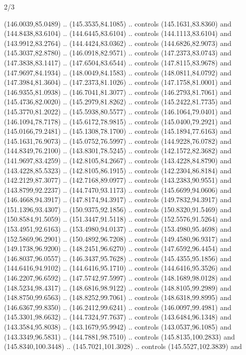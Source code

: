 \begin{flagdescription}{2/3}
\begin{scope}[xshift=0.5\flaglength,yshift=0.5\flagwidth,scale=\flagwidth/180]
\begin{scope}[y=0.8pt, x=0.8pt, yscale=-1,shift={(-168.75,-108.75)}]
  (146.0039,85.0489) .. (145.3535,84.1085) .. controls (145.1631,83.8360) and
  (144.8438,83.6104) .. (144.6445,83.6104) .. controls (144.1113,83.6104) and
  (143.9912,83.2764) .. (144.4424,83.0362) .. controls (144.6826,82.9073) and
  (145.3037,82.8780) .. (146.0918,82.9571) .. controls (147.2373,83.0743) and
  (147.3838,83.1417) .. (147.6504,83.6544) .. controls (147.8115,83.9678) and
  (147.9697,84.1934) .. (148.0049,84.1583) .. controls (148.0811,84.0792) and
  (147.3984,81.3604) .. (147.2373,81.1026) .. controls (147.1758,81.0001) and
  (146.9355,81.0938) .. (146.7041,81.3077) .. controls (146.2793,81.7061) and
  (145.4736,82.0020) .. (145.2979,81.8262) .. controls (145.2422,81.7735) and
  (145.3770,81.2022) .. (145.5938,80.5577) .. controls (146.1064,79.0401) and
  (146.1094,78.7178) .. (145.6172,78.9815) .. controls (145.0400,79.2921) and
  (145.0166,79.2481) .. (145.1308,78.1700) .. controls (145.1894,77.6163) and
  (145.1631,76.9073) .. (145.0752,76.5997) .. controls (144.9228,76.0782) and
  (144.8349,76.2100) .. (143.8301,78.5245) .. controls (142.1572,82.3682) and
  (141.9697,83.4259) .. (142.8105,84.2667) .. controls (143.4228,84.8790) and
  (143.4228,85.5323) .. (142.8105,86.1915) .. controls (142.2304,86.8184) and
  (142.2129,87.3077) .. (142.7168,89.0977) .. controls (143.2383,90.9551) and
  (143.8799,92.2237) .. (144.7470,93.1173) .. controls (145.6699,94.0606) and
  (146.4668,94.3917) .. (147.8174,94.3917) .. controls (149.7832,94.3917) and
  (151.1396,93.4307) .. (150.9375,92.1856) .. controls (150.8320,91.5469) and
  (150.8584,91.5059) .. (151.3447,91.5118) .. controls (152.5576,91.5264) and
  (153.4951,92.6163) .. (153.4980,94.0137) .. controls (153.4980,95.4698) and
  (152.5869,96.2901) .. (150.4892,96.7208) .. controls (149.4580,96.9317) and
  (149.1738,96.9200) .. (148.2451,96.6270) .. controls (147.6592,96.4454) and
  (146.8037,96.0557) .. (146.3437,95.7628) .. controls (145.4355,95.1856) and
  (144.6416,94.9102) .. (144.6416,95.1710) .. controls (144.6416,95.3526) and
  (146.2207,96.6592) .. (147.5742,97.5997) .. controls (148.1689,98.0128) and
  (148.5234,98.4317) .. (148.6816,98.9122) .. controls (148.8105,99.2989) and
  (148.8750,99.6563) .. (148.8252,99.7061) .. controls (148.6318,99.8995) and
  (146.6367,99.8350) .. (146.2412,99.6241) .. controls (146.0097,99.4981) and
  (145.3301,98.6632) .. (144.7324,97.7637) .. controls (143.6484,96.1348) and
  (143.3584,95.8038) .. (143.1679,95.9942) .. controls (143.0537,96.1085) and
  (143.3349,96.5831) .. (144.7881,98.7510) .. controls (145.8135,100.2833) and
  (145.8340,100.3448) .. (145.7021,101.3028) .. controls (145.5527,102.3839) and

\end{scope}
\end{scope}
\end{flagdescription}
